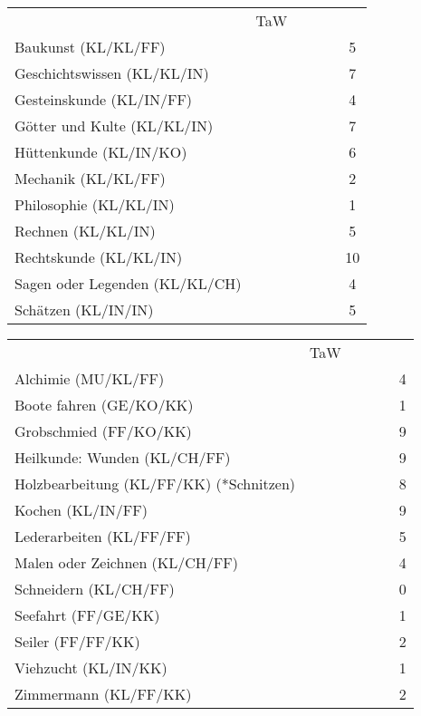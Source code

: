 \documentclass{article}
\begin{document}
  \begin{table}[ht]
    \centering
    \begin{tabularx}{0.8\linewidth}{|Xclcc|c|}
      \hline
      \rowcolor{gray} \multicolumn{5}{|l|}{Wissen (B)} & TaW\\
      \rowcolor{white} Baukunst (KL/KL/FF) &&&&&5\\
      \rowcolor{white} Geschichtswissen (KL/KL/IN) &&&&&7\\
      \rowcolor{white} Gesteinskunde (KL/IN/FF) &&&&&4\\
      \rowcolor{white} Götter und Kulte (KL/KL/IN) &&&&&7\\
      \rowcolor{white} Hüttenkunde (KL/IN/KO) &&&&&6\\
      \rowcolor{white} Mechanik (KL/KL/FF) &&&&&2\\
      \rowcolor{white} Philosophie (KL/KL/IN) &&&&&1\\
      \rowcolor{white} Rechnen (KL/KL/IN) &&&&&5\\
      \rowcolor{white} Rechtskunde (KL/KL/IN) &&&&&10\\
      \rowcolor{white} Sagen oder Legenden (KL/KL/CH) &&&&&4\\
      \rowcolor{white} Schätzen (KL/IN/IN) &&&&&5\\
      \hline
    \end{tabularx}
    \centering
    \begin{tabularx}{0.8\linewidth}{|Xclcc|c|}
      \hline
      \rowcolor{gray} \multicolumn{5}{|l|}{Handwerk (B)} & TaW\\
      \rowcolor{white} Alchimie (MU/KL/FF) &&&&&4\\
      \rowcolor{white} Boote fahren (GE/KO/KK) &&&&&1\\
      \rowcolor{white} Grobschmied (FF/KO/KK) &&&&&9\\
      \rowcolor{white} Heilkunde: Wunden (KL/CH/FF) &&&&&9\\
      \rowcolor{white} Holzbearbeitung  (KL/FF/KK) (*Schnitzen) &&&&&8\\
      \rowcolor{white} Kochen (KL/IN/FF) &&&&&9\\
      \rowcolor{white} Lederarbeiten (KL/FF/FF) &&&&&5\\
      \rowcolor{white} Malen oder Zeichnen (KL/CH/FF) &&&&&4\\
      \rowcolor{white} Schneidern (KL/CH/FF) &&&&&0\\
      \rowcolor{white} Seefahrt (FF/GE/KK) &&&&&1\\
      \rowcolor{white} Seiler (FF/FF/KK) &&&&&2\\
      \rowcolor{white} Viehzucht (KL/IN/KK) &&&&&1\\
      \rowcolor{white} Zimmermann (KL/FF/KK) &&&&&2\\
      \hline
    \end{tabularx}
  \end{table}
\end{document}
